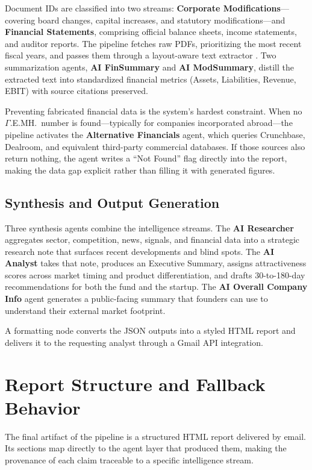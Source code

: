 \documentclass[12pt]{article}
\begin{document}
Document IDs are classified into two streams: \textbf{Corporate Modifications}---covering board
changes, capital increases, and statutory modifications---and \textbf{Financial Statements},
comprising official balance sheets, income statements, and auditor reports. The pipeline fetches
raw PDFs, prioritizing the most recent fiscal years, and passes them through a layout-aware text
extractor \parencite{paruchuri2025marker}. Two summarization agents, \textbf{AI FinSummary} and
\textbf{AI ModSummary}, distill the extracted text into standardized financial metrics (Assets,
Liabilities, Revenue, EBIT) with source citations preserved.

Preventing fabricated financial data is the system's hardest constraint. When no $\Gamma$.E.MH.\
number is found---typically for companies incorporated abroad---the pipeline activates the
\textbf{Alternative Financials} agent, which queries Crunchbase, Dealroom, and equivalent
third-party commercial databases. If those sources also return nothing, the agent writes a ``Not Found'' flag
directly into the report, making the data gap explicit rather than filling it with generated
figures.

\subsection{Synthesis and Output Generation}
\label{sec:output}

Three synthesis agents combine the intelligence streams. The \textbf{AI Researcher} aggregates
sector, competition, news, signals, and financial data into a strategic research note that surfaces
recent developments and blind spots. The \textbf{AI Analyst} takes that note, produces an
Executive Summary, assigns attractiveness scores across market timing and product differentiation,
and drafts 30-to-180-day recommendations for both the fund and the startup. The \textbf{AI Overall
Company Info} agent generates a public-facing summary that founders can use to understand their
external market footprint.

A formatting node converts the JSON outputs into a styled HTML report and delivers it to the
requesting analyst through a Gmail API integration.

\section{Report Structure and Fallback Behavior}
\label{sec:report}

The final artifact of the pipeline is a structured HTML report delivered by email. Its sections
map directly to the agent layer that produced them, making the provenance of each claim traceable
to a specific intelligence stream.
\end{document}
